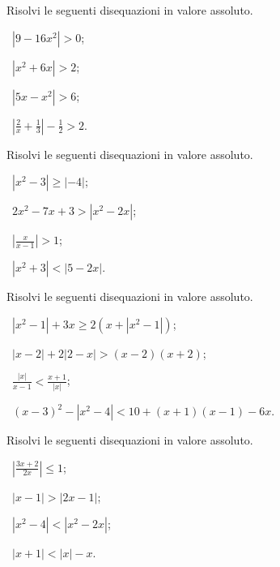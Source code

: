 \begin{esercizio}[\Ast]
 \label{ese:7.32}
Risolvi le seguenti disequazioni in valore assoluto.
\begin{multicols}{2}
 \begin{enumeratea}
 \item~$\left|9-16x^2\right|>0$;
 \item~$\left|x^2+6x\right|>2$;
 \item~$\left|5x-x^2\right|>6$;
 \item~$\left|\frac 2 x+\frac 1 3\right|-\frac 1 2>2$.
 \end{enumeratea}
 \end{multicols}
\end{esercizio}

\begin{esercizio}[\Ast]
 \label{ese:7.33}
Risolvi le seguenti disequazioni in valore assoluto.
\begin{multicols}{2}
 \begin{enumeratea}
 \item~$\left|x^2-3\right|\ge \left|-4\right|$;
 \item~$2x^2-7x+3>\left|x^2-2x\right|$;
 \item~$\left|\frac x{x-1}\right|>1$;
 \item~$\left|x^2+3\right|<\left|5-2x\right|$.
 \end{enumeratea}
 \end{multicols}
\end{esercizio}

\begin{esercizio}[\Ast]
 \label{ese:7.34}
Risolvi le seguenti disequazioni in valore assoluto.
 \begin{enumeratea}
 \item~$\left|x^2-1\right|+3x\ge 2\left(x+\left|x^2-1\right|\right)$;
 \item~$\left|x-2\right|+2\left|2-x\right|>(x-2)(x+2)$;
 \item~$\frac{\left|x\right|}{x-1}<\frac{x+1}{\left|x\right|}$;
 \item~$(x-3)^2-\left|x^2-4\right|<10+(x+1)(x-1)-6x$.
 \end{enumeratea}
\end{esercizio}

\begin{esercizio}[\Ast]
 \label{ese:7.35}
Risolvi le seguenti disequazioni in valore assoluto.
\begin{multicols}{2}
 \begin{enumeratea}
 \item~$\left|\frac{3x+2}{2x}\right|\le 1$;
 \item~$\left|x-1\right|>\left|2x-1\right|$;
 \item~$\left|x^2-4\right|<\left|x^2-2x\right|$;
 \item~$\left|x+1\right|<\left|x\right|-x$.
 \end{enumeratea}
 \end{multicols}
\end{esercizio}

